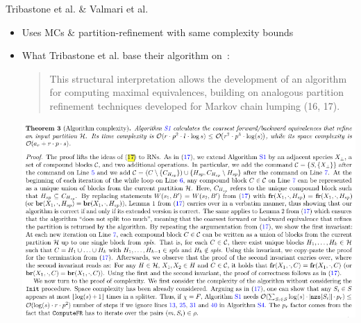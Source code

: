 \documentclass[rgb, pdf]{beamer}
\begin{document}
\begin{frame}[allowframebreaks]{Tribastone et al. \& Valmari et al.}
\begin{minipage}{0.45\textwidth}
    \end{minipage}     
    \framebreak
    \begin{itemize}
    \item Uses MCs \& partition-refinement with same complexity bounds~\autocite{valmari} \\ \vspace{0.7cm}
     \item What Tribastone et al. base their algorithm on~\autocite{Cardelli2017MaximalAO}: \\
     \vspace{1.5cm}
     \begin{quotation}
       This structural interpretation allows the development of an algorithm for computing maximal equivalences, building on analogous partition refinement techniques developed for Markov chain lumping (16, 17).
     \end{quotation}

        \includegraphics[height=0.8\textheight, width=\textwidth, keepaspectratio]{img/pnas_corectness.png}
    \end{itemize}
    \end{frame}

    
   
\end{document}
